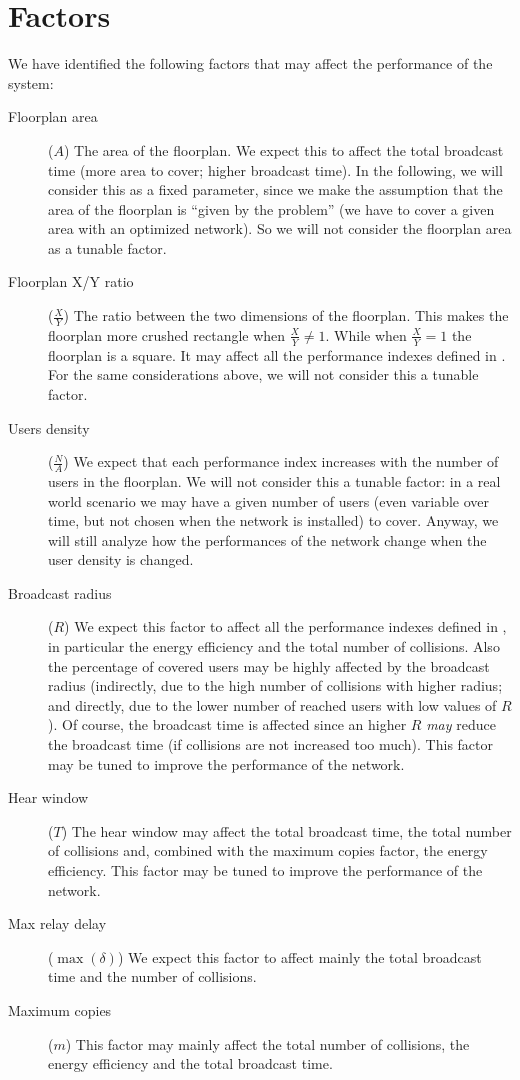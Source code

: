 \section{Factors}\label{sec:factors}

We have identified the following factors that may affect the performance of the
system:
\begin{description}
	\item[Floorplan area] (\(A\)) The area of the floorplan. We expect this
		to affect the total broadcast time (more area to cover; higher
		broadcast time). In the following, we will consider this as a
		fixed parameter, since we make the assumption that the area of
		the floorplan is ``given by the problem'' (we have to cover a
		given area with an optimized network). So we will not consider
		the floorplan area as a tunable factor.
	\item[Floorplan X/Y ratio] (\(\frac{X}{Y}\)) The ratio between the two
		dimensions of the floorplan. This makes the floorplan more
		crushed rectangle when \(\frac{X}{Y} \neq 1\). While when
		\(\frac{X}{Y} = 1\) the floorplan is a square. It may affect all
		the performance indexes defined in . For the
		same considerations above, we will not consider this a tunable
		factor.
	\item[Users density] (\(\frac{N}{A}\)) We expect that each performance
		index increases with the number of users in the floorplan. We
		will not consider this a tunable factor: in a real world
		scenario we may have a given number of users (even variable over
		time, but not chosen when the network is installed) to cover.
		Anyway, we will still analyze how the performances of the
		network change when the user density is changed.
	\item[Broadcast radius] (\(R\)) We expect this factor to affect all the
		performance indexes defined in , in
		particular the energy efficiency and the total number of
		collisions. Also the percentage of covered users may be highly
		affected by the broadcast radius (indirectly, due to the high
		number of collisions with higher radius; and directly, due to
		the lower number of reached users with low values of \(R\)). Of
		course, the broadcast time is affected since an higher \(R\)
		\emph{may} reduce the broadcast time (if collisions are not
		increased too much).
		This factor may be tuned to improve the performance of the
		network.
	\item[Hear window] (\(T\)) The hear window may affect the total
		broadcast time, the total number of collisions and, combined
		with the maximum copies factor, the energy efficiency. This
		factor may be tuned to improve the performance of the network.
	\item[Max relay delay] (\(\max(\delta)\)) We expect this factor to
		affect mainly the total broadcast time and the number of
		collisions.
	\item[Maximum copies] (\(m\)) This factor may mainly affect the total
		number of collisions, the energy efficiency and the total
		broadcast time.
\end{description}
